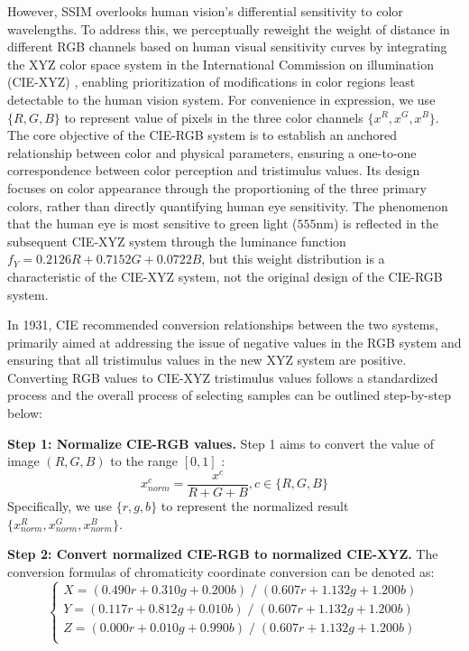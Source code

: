 \documentclass{article}
\begin{document}
However, SSIM overlooks human vision's differential sensitivity to color wavelengths. To address this, we perceptually reweight the weight of distance in different RGB channels based on human visual sensitivity curves by integrating the XYZ color space system in the International Commission on illumination (CIE-XYZ) , enabling prioritization of modifications in color regions least detectable to the human vision system. For convenience in expression, we use \(\{R, G, B\}\) to represent value of pixels in the three color channels \(\{x^R, x^G, x^B\}\). The core objective of the CIE-RGB system is to establish an anchored relationship between color and physical parameters, ensuring a one-to-one correspondence between color perception and tristimulus values. Its design focuses on color appearance through the proportioning of the three primary colors, rather than directly quantifying human eye sensitivity. The phenomenon that the human eye is most sensitive to green light (\(555\)nm) is reflected in the subsequent CIE-XYZ system through the luminance function \(f_Y=0.2126R+0.7152G+0.0722B\), but this weight distribution is a characteristic of the CIE-XYZ system, not the original design of the CIE-RGB system. 

In 1931, CIE recommended conversion relationships between the two systems, primarily aimed at addressing the issue of negative values in the RGB system and ensuring that all tristimulus values in the new XYZ system are positive. Converting RGB values to CIE-XYZ tristimulus values follows a standardized process and the overall process of selecting samples can be outlined step-by-step below:

\textbf{Step 1: Normalize CIE-RGB values.} Step 1 aims to convert the value of image \((R,G,B)\) to the range \([0,1]\) :
\begin{equation}
x_{norm}^c = \frac{x^c}{R+G+B}, c \in\{R,G,B\}
\end{equation}
Specifically, we use \(\{r,g,b\}\) to represent the normalized result \(\{x_{norm}^R, x_{norm}^G, x_{norm}^B\}\).

\textbf{Step 2: Convert normalized CIE-RGB to normalized CIE-XYZ.}  The conversion formulas of chromaticity coordinate conversion can be denoted as:
\begin{equation}
\begin{cases}
X=(0.490r+0.310g+0.200b)\;/\;(0.607r+1.132g+1.200b)\\
Y=(0.117r+0.812g+0.010b)\;/\;(0.607r+1.132g+1.200b)\\
Z=(0.000r+0.010g+0.990b)\;/\;(0.607r+1.132g+1.200b)\\
\end{cases}
\end{equation}
\end{document}
